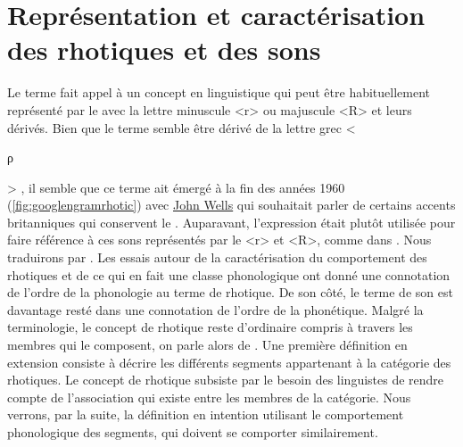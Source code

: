 
\section{Représentation et caractérisation des rhotiques et des sons } \label{sec:similr}


Le terme  fait appel à un concept en linguistique qui peut être habituellement représenté par le  avec la lettre minuscule <r> ou majuscule <R> et leurs dérivés. 
Bien que le terme  semble être dérivé de la lettre grec <\begin{greek}ρ\end{greek}> \parencite{wieseRepresentationRhoticsRepresentation2011}, il semble que ce terme ait émergé à la fin des années 1960 (\autoref{fig:googlengramrhotic}) avec \href{http://phonetic-blog.blogspot.com/2010/07/rhotic.html}{John Wells} qui souhaitait parler de certains accents britanniques qui conservent le  \parencite[78--79]{wellsJohnWellsPhonetic2010,wellsSoundsInteresting2014}.
Auparavant, l'expression  était plutôt utilisée pour faire référence à ces sons représentés par le <r> et <R>, comme dans \textcite[78]{maddiesonPatternsSounds1984}. Nous traduirons  par .
Les essais autour de la caractérisation du comportement des rhotiques et de ce qui en fait une classe phonologique ont donné une connotation de l'ordre de la phonologie au terme de rhotique. De son côté, le terme de son  est davantage resté dans une connotation de l'ordre de la phonétique.
Malgré la terminologie, le concept de rhotique reste d'ordinaire compris à travers les membres qui le composent, on parle alors de . Une première définition en extension consiste à décrire les différents segments appartenant à la catégorie des rhotiques. Le concept de rhotique subsiste par le besoin des linguistes de rendre compte de l'association qui existe entre les membres de la catégorie. Nous verrons, par la suite, la définition en intention utilisant le comportement phonologique des segments, qui doivent se comporter similairement.

